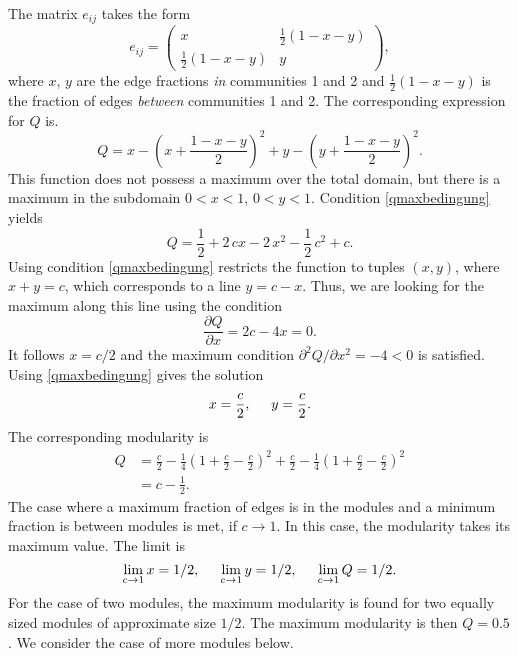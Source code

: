 The matrix $e_{ij}$ takes the form
\[
e_{ij}=\left(\begin{array}{cc}x & \frac{1}{2}(1-x-y) \\ \frac{1}{2}(1-x-y) & y\end{array}\right) ,
\]
where $x$, $y$ are the edge fractions \emph{in} communities 1 and 2 and $\frac{1}{2}(1-x-y)$ is the fraction of edges \emph{between} communities 1 and 2.
The corresponding expression for $Q$ is.
\[
Q=x-\left( x+\frac{1-x-y}{2} \right) ^2 +y -\left( y+\frac{1-x-y}{2} \right) ^2 .
\]
This function does not possess a maximum over the total domain, but there is a maximum in the subdomain $0<x<1$, $ 0<y<1$.
Condition \eqref{qmaxbedingung} yields
\[
Q=\frac{1}{2}+2\, cx-2\, x^2-\frac{1}{2}\, c^2+c.
\]
Using condition \eqref{qmaxbedingung} restricts the function to tuples $(x,y)$, where $x+y=c$, which corresponds to a line $y=c-x$.
Thus, we are looking for the maximum along this line using the condition
\[
\frac{\partial Q}{\partial x}=2c-4x=0.
\]
It follows $x=c/2$ and the maximum condition $\partial ^2 Q/\partial x^2 =-4<0$ is satisfied.
Using \eqref{qmaxbedingung} gives the solution
\begin{equation}\label{qmax_xy}
x=\frac{c}{2} , \hspace{0.5cm} y=\frac{c}{2}.
\end{equation}
The corresponding modularity is 
\begin{align*}
Q&=\frac{c}{2}-\frac{1}{4}\left( 1+\frac{c}{2}-\frac{c}{2} \right) ^2 +\frac{c}{2}-\frac{1}{4}\left( 1+\frac{c}{2}-\frac{c}{2} \right) ^2 \\
&= c- \frac{1}{2} .
\end{align*}
The case where a maximum fraction of edges is in the modules and a minimum fraction is between modules is met, if $c\rightarrow 1$.
In this case, the modularity takes its maximum value.
The limit is
\begin{equation}\label{q2limits}
\lim _{c\rightarrow 1} x =1/2, \hspace{0.5cm}\lim _{c\rightarrow 1} y =1/2, \hspace{0.5cm} \lim _{c\rightarrow 1} Q=1/2.
\end{equation}
For the case of two modules, the maximum modularity is found for two equally sized modules of approximate size $1/2$.
The maximum modularity is then $Q=0.5$.
We consider the case of more modules below.

%
